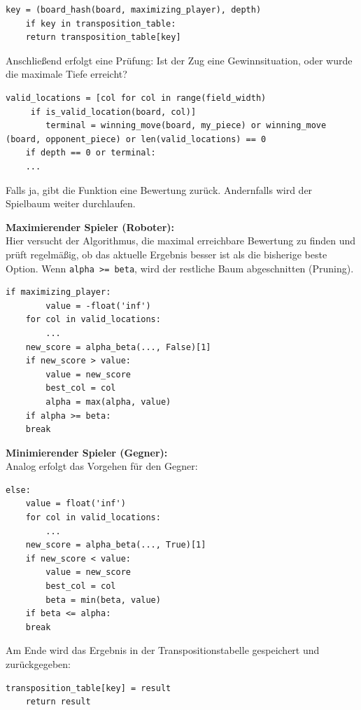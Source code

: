 \begin{lstlisting}[style=pythonstyle]
	key = (board_hash(board, maximizing_player), depth)
	if key in transposition_table:
	return transposition_table[key]
\end{lstlisting}

Anschließend erfolgt eine Prüfung: Ist der Zug eine Gewinnsituation, oder wurde die maximale Tiefe erreicht?

\begin{lstlisting}[style=pythonstyle]
	valid_locations = [col for col in range(field_width)
	 if is_valid_location(board, col)]
		terminal = winning_move(board, my_piece) or winning_move	(board, opponent_piece) or len(valid_locations) == 0
	if depth == 0 or terminal:
	...
\end{lstlisting}

Falls ja, gibt die Funktion eine Bewertung zurück. Andernfalls wird der Spielbaum weiter durchlaufen.

\textbf{Maximierender Spieler (Roboter):}\\
Hier versucht der Algorithmus, die maximal erreichbare Bewertung zu finden und prüft regelmäßig, ob das aktuelle Ergebnis besser ist als die bisherige beste Option. Wenn \texttt{alpha >= beta}, wird der restliche Baum abgeschnitten (Pruning).

\begin{lstlisting}[style=pythonstyle]
	if maximizing_player:
		value = -float('inf')
	for col in valid_locations:
		...
	new_score = alpha_beta(..., False)[1]
	if new_score > value:
		value = new_score
		best_col = col
		alpha = max(alpha, value)
	if alpha >= beta:
	break
\end{lstlisting}

\textbf{Minimierender Spieler (Gegner):}\\
Analog erfolgt das Vorgehen für den Gegner:

\begin{lstlisting}[style=pythonstyle]
	else:
	value = float('inf')
	for col in valid_locations:
		...
	new_score = alpha_beta(..., True)[1]
	if new_score < value:
		value = new_score
		best_col = col
		beta = min(beta, value)
	if beta <= alpha:
	break
\end{lstlisting}

Am Ende wird das Ergebnis in der Transpositionstabelle gespeichert und zurückgegeben:

\begin{lstlisting}[style=pythonstyle]
	transposition_table[key] = result
	return result
\end{lstlisting}

